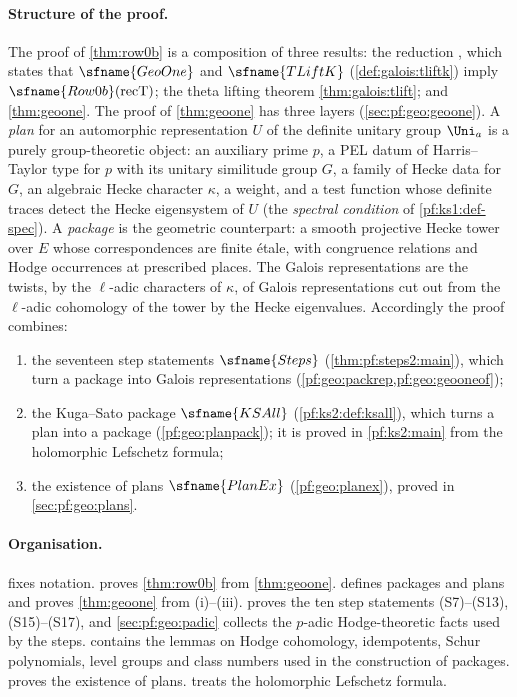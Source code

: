 \paragraph{Structure of the proof.}
The proof of \cref{thm:row0b} is a composition of three results: the reduction
, which states that
$\sfname{GeoOne}$ and $\sfname{TLiftK}$ (\cref{def:galois:tliftk}) imply
$\sfname{Row0b}(\mathrm{recT})$; the theta lifting theorem \cref{thm:galois:tlift}; and
\cref{thm:geoone}. The proof of \cref{thm:geoone} has three layers (\cref{sec:pf:geo:geoone}).
A \emph{plan} for an automorphic representation $U$ of the definite unitary group $\Uni_a$ is a
purely group-theoretic object: an auxiliary prime $p$, a PEL datum of Harris--Taylor type for $p$
with its unitary similitude group $G$, a family of Hecke data for $G$, an algebraic Hecke character
$\kappa$, a weight, and a test function whose definite traces detect the Hecke eigensystem of $U$
(the \emph{spectral condition} of \cref{pf:ks1:def-spec}). A \emph{package} is the geometric
counterpart: a smooth projective Hecke tower over $E$ whose correspondences are finite \'etale,
with congruence relations and Hodge occurrences at prescribed places. The Galois representations
are the twists, by the $\ell$-adic characters of $\kappa$, of Galois representations cut out from the
$\ell$-adic cohomology of the tower by the Hecke eigenvalues. Accordingly the proof combines:
\begin{enumerate}[label=(\roman*),nosep]
\item the seventeen step statements $\sfname{Steps}$ (\cref{thm:pf:steps2:main}), which turn a
  package into Galois representations (\cref{pf:geo:packrep,pf:geo:geooneof});
\item the Kuga--Sato package $\sfname{KSAll}$ (\cref{pf:ks2:def:ksall}), which turns a plan into a
  package (\cref{pf:geo:planpack}); it is proved in \cref{pf:ks2:main} from the holomorphic
  Lefschetz formula;
\item the existence of plans $\sfname{PlanEx}$ (\cref{pf:geo:planex}), proved in
  \cref{sec:pf:geo:plans}.
\end{enumerate}

\paragraph{Organisation.}
 fixes notation.  proves \cref{thm:row0b} from
\cref{thm:geoone}.  defines packages and plans and proves
\cref{thm:geoone} from (i)--(iii).  proves the ten step statements
(S7)--(S13), (S15)--(S17), and \cref{sec:pf:geo:padic} collects the $p$-adic Hodge-theoretic facts
used by the steps.  contains the lemmas on Hodge cohomology, idempotents,
Schur polynomials, level groups and class numbers used in the construction of packages.
 proves the existence of plans.  treats the
holomorphic Lefschetz formula.

